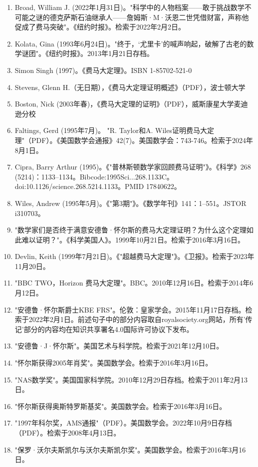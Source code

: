 \begin{enumerate}
\item Broad, William J. (2022年1月31日)。"科学中的人物档案——敢于挑战数学不可能之谜的德克萨斯石油继承人——詹姆斯·M·沃恩二世凭借财富，声称他促成了费马突破"。《纽约时报》。检索于2022年2月2日。  
\item Kolata, Gina (1993年6月24日)。"终于，‘尤里卡’的喊声响起，破解了古老的数学谜团"。《纽约时报》。2013年1月21日存档。  
\item Simon Singh (1997)。《费马大定理》。ISBN 1-85702-521-0  
\item Stevens, Glenn H.（无日期），《费马大定理证明概述》（PDF），波士顿大学
\item Boston, Nick (2003年春)，《费马大定理的证明》（PDF），威斯康星大学麦迪逊分校  
\item Faltings, Gerd (1995年7月)。 "R. Taylor和A. Wiles证明费马大定理"（PDF）。《美国数学会通报》42(7)。美国数学会：743-746。检索于2024年8月1日。  
\item Cipra, Barry Arthur (1995)。《"普林斯顿数学家回顾费马证明"》。《科学》268 (5214)：1133–1134。Bibcode:1995Sci...268.1133C。doi:10.1126/science.268.5214.1133。PMID 17840622。  
\item Wiles, Andrew (1995年5月)。《"第3期"》。《数学年刊》141：1–551。JSTOR i310703。  
\item "数学家们是否终于满意安德鲁·怀尔斯的费马大定理证明？为什么这个定理如此难以证明？"。《科学美国人》。1999年10月21日。检索于2016年3月16日。  
\item Devlin, Keith (1999年7月21日)。《"超越费马大定理"》。《卫报》。检索于2023年11月20日。  
\item "BBC TWO，Horizon 费马大定理"。BBC。2010年12月16日。检索于2014年6月12日。  
\item "安德鲁·怀尔斯爵士KBE FRS"。伦敦：皇家学会。2015年11月17日存档。检索于2022年2月1日。前述句子中的部分内容取自royalsociety.org网站，所有'传记'部分的内容均在知识共享署名4.0国际许可协议下发布。  
\item "安德鲁·J·怀尔斯"。美国艺术与科学院。检索于2021年12月10日。  
\item "怀尔斯获得2005年肖奖"。美国数学会。检索于2016年3月16日。  
\item "NAS数学奖"。美国国家科学院。2010年12月29日存档。检索于2011年2月13日。  
\item "怀尔斯获得奥斯特罗斯基奖"。美国数学会。检索于2016年3月16日。  
\item "1997年科尔奖，AMS通报"（PDF）。美国数学会。2022年10月9日存档（PDF）。检索于2008年4月13日。  
\item "保罗·沃尔夫斯凯尔与沃尔夫斯凯尔奖"。美国数学会。检索于2016年3月16日。  

\end{enumerate}
